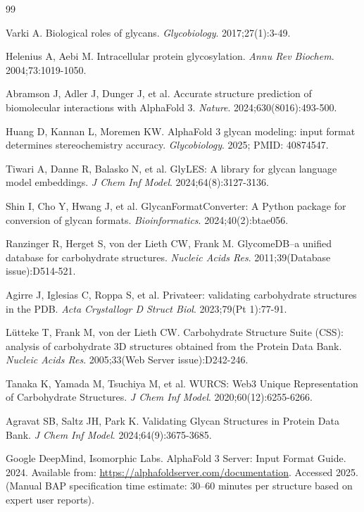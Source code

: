 \documentclass[11pt,a4paper]{article}
\begin{document}
\begin{thebibliography}{99}

Varki A. Biological roles of glycans. \textit{Glycobiology}. 2017;27(1):3-49.

Helenius A, Aebi M. Intracellular protein glycosylation. \textit{Annu Rev Biochem}. 2004;73:1019-1050.

Abramson J, Adler J, Dunger J, et al. Accurate structure prediction of biomolecular interactions with AlphaFold 3. \textit{Nature}. 2024;630(8016):493-500.

Huang D, Kannan L, Moremen KW. AlphaFold 3 glycan modeling: input format determines stereochemistry accuracy. \textit{Glycobiology}. 2025; PMID: 40874547.

Tiwari A, Danne R, Balasko N, et al. GlyLES: A library for glycan language model embeddings. \textit{J Chem Inf Model}. 2024;64(8):3127-3136.

Shin I, Cho Y, Hwang J, et al. GlycanFormatConverter: A Python package for conversion of glycan formats. \textit{Bioinformatics}. 2024;40(2):btae056.

Ranzinger R, Herget S, von der Lieth CW, Frank M. GlycomeDB--a unified database for carbohydrate structures. \textit{Nucleic Acids Res}. 2011;39(Database issue):D514-521.

Agirre J, Iglesias C, Roppa S, et al. Privateer: validating carbohydrate structures in the PDB. \textit{Acta Crystallogr D Struct Biol}. 2023;79(Pt 1):77-91.

L\"utteke T, Frank M, von der Lieth CW. Carbohydrate Structure Suite (CSS): analysis of carbohydrate 3D structures obtained from the Protein Data Bank. \textit{Nucleic Acids Res}. 2005;33(Web Server issue):D242-246.

Tanaka K, Yamada M, Tsuchiya M, et al. WURCS: Web3 Unique Representation of Carbohydrate Structures. \textit{J Chem Inf Model}. 2020;60(12):6255-6266.

Agravat SB, Saltz JH, Park K. Validating Glycan Structures in Protein Data Bank. \textit{J Chem Inf Model}. 2024;64(9):3675-3685.

Google DeepMind, Isomorphic Labs. AlphaFold 3 Server: Input Format Guide. 2024. Available from: \url{https://alphafoldserver.com/documentation}. Accessed 2025. (Manual BAP specification time estimate: 30--60 minutes per structure based on expert user reports).

\end{thebibliography}
\end{document}
